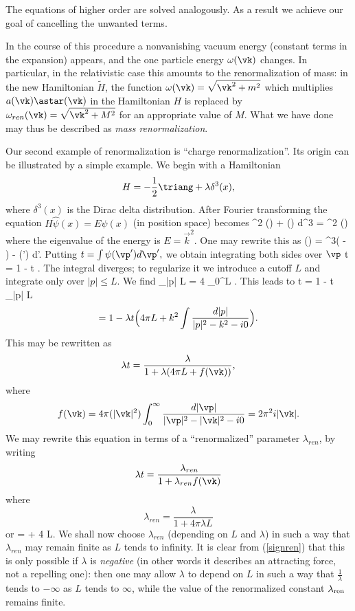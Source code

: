 The equations of higher order are solved analogously. As a result we 
achieve our goal of cancelling the unwanted terms. 

In the course of 
this procedure a nonvanishing vacuum energy  (constant terms in the 
expansion) appears, and the one particle energy $\omega (\vk)$ changes. 
In particular, in the relativistic case this amounts to the 
renormalization of mass:
 in the 
new Hamiltonian $\tilde{H}$, the 
function $\omega(\vk) = \sqrt{\vk^2 + m^2} $ which 
multiplies $a (\vk) \astar(\vk)$ in the Hamiltonian 
$H$  is replaced by 
$\omega_{ren}(\vk) = \sqrt{\vk^2 + M^2} $ for an appropriate value of $M$. 
What we have done may thus be described as {\em mass renormalization}.



Our second example of renormalization is ``charge renormalization''. 
Its origin can be illustrated by a simple example.
We begin with a Hamiltonian 
$$H = - \half \triang + \lambda \delta^3 (x), $$
where $\delta^3(x)$ is the Dirac delta distribution. After 
Fourier transforming the equation $H \hat{\psi}(x) = E \hat{\psi}(x)$ (in 
position space) becomes
\beq \vp^2  \psi(\vp) +
 \lambda \int \psi(\vp) d^3 \vp = \vk^2 \psi(\vp) \eeq
where the eigenvalue of the energy is $E = \vec{k}^2$. 
One may rewrite this as 
\beq \psi(\vp) = \delta^3( - ) - 
\int \psi(') d'. \eeq
Putting $t = \int \psi(\vp') d\vp', $ we obtain integrating both sides
over $\vp$
\beq t = 1 - \lambda t \int {}. \eeq
The integral diverges; to regularize it we introduce a cutoff 
$L $ and integrate only over $|p| \le L$.  We find
\beq \int_{|p| \le L}   = 
4 \pi \int_{0}^L . \eeq
This leads to 
\beq t  = 1 - \lambda t 
\int_{|p| \le L }     \eeq
$$ = 1 - \lambda t \Bigl ( 4 \pi  L + k^2  \int \frac{d|p|}{
|p|^2 - k^2 - i 0 } \Bigr ). $$ 
This may be rewritten as 
$$ \lambda t = \frac{\lambda}{1 + \lambda (4 \pi  L +  f(\vk))}, $$
where 
$$f(\vk) = 4 \pi (|\vk|^2) \int_0^\infty \frac{d|\vp|}{|\vp|^2 - |\vk|^2 - i 0}
= 2\pi^2 i |\vk|. $$
We may rewrite this equation 
in terms of a ``renormalized'' parameter $\lambda_{ren}$, by
writing
$$ \lambda t 
= \frac{\lambda_{ren} }{1 + 
\lambda_{ren} f(\vk)} $$
where
$$\lambda_{ren} = \frac{\lambda}{1 + 4 \pi \lambda L } $$ 
or 
\beq \label{signren}  = 
 + 4 \pi L. \eeq
We shall now choose $\lambda_{ren}$ (depending on $L$ and $\lambda$) 
in such a way that $\lambda_{ren}$ may remain finite as $L$ tends to 
infinity. 
It is clear from (\ref{signren}) that this is only possible if $\lambda$ is 
{\em negative} (in other words it describes an attracting 
force, not a repelling one):  then one 
may allow  $\lambda$ to depend on 
$L$ in such a way that $\frac{1}{\lambda}$ tends to $- \infty$ as 
$L$ tends to $\infty$, while the 
value of the renormalized constant $\lambda_{\rm ren}$ remains finite.

